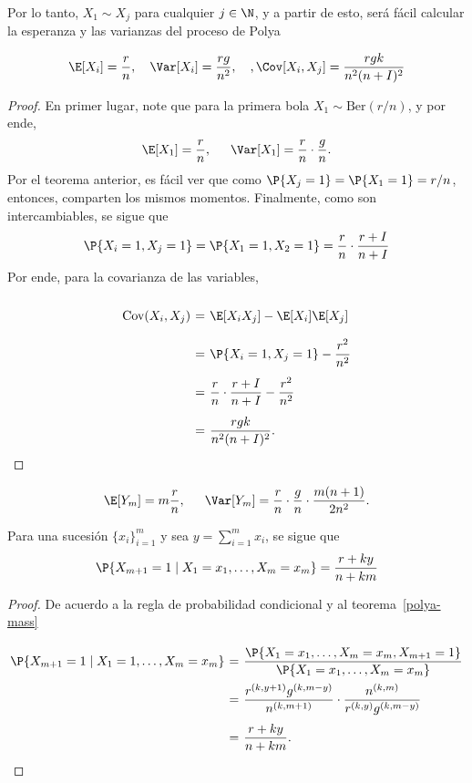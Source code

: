Por lo tanto, $X_1\sim X_j$ para cualquier $j\in\N$, y a partir de esto, será fácil calcular la esperanza y las varianzas del proceso de Polya

\begin{theorem}
    \[ \E[X_i] = \frac{r}{n},\hspace*{1em} \Var[X_i] = \frac{rg}{n^2},\hspace*{1em}, \Cov[X_i,X_j] = \frac{rgk}{n^2 (n+I)^2}  \]
\end{theorem}
\begin{proof}
    En primer lugar, note que para la primera bola $X_1 \sim \text{Ber}(r/n)$, y por ende,
    \[ \E[X_1] = \frac{r}{n},\hspace*{1.5em} \Var[X_1] = \frac{r}{n}\cdot\frac{g}{n}. \]
    Por el teorema anterior, es fácil ver que como $\P\{X_j = 1\} = \P\{X_1 = 1\} = r/n$, entonces, comparten los mismos momentos. Finalmente, como son intercambiables, se sigue que
    \[ \P\{X_i = 1, X_j = 1\} = \P\{X_1 = 1, X_2 = 1\} = \frac{r}{n}\cdot \frac{r+I}{n+I} \]
    Por ende, para la covarianza de las variables,
    \[ \everymath{\displaystyle}
    \arraycolsep=1.8pt\def\arraystretch{2.5}
    \begin{array}{rcl}
        \text{Cov}(X_i,X_j) & = & \E[X_i X_j] - \E[X_i]\E[X_j]\\
        & = & \P\{X_i = 1, X_j = 1\} - \frac{r^2}{n^2}\\
        & = & \frac{r}{n}\cdot \frac{r+I}{n+I} - \frac{r^2}{n^2}\\
        & = & \frac{rgk}{n^2 (n+I)^2}.
    \end{array} \]

\end{proof}

\begin{corollary}
    \[ \E[Y_m] = m\frac{r}{n},\hspace*{1.5em} \Var[Y_m] = \frac{r}{n} \cdot \frac{g}{n} \cdot \frac{m(n+1)}{2n^2}. \]
\end{corollary}

\begin{theorem}
    Para una sucesión $\{x_i\}_{i = 1}^m$ y sea $y = \sum_{i = 1}^m x_i$, se sigue que
    \[ \P\{X_{m+1} = 1 \;|\; X_1 = x_1, \ldots, X_m = x_m\} = \frac{r+ky}{n+km} \]
\end{theorem}
\begin{proof} De acuerdo a la regla de probabilidad condicional y al teorema~\ref{polya-mass}
    \[ \everymath{\displaystyle}
    \arraycolsep=1.8pt\def\arraystretch{2.5}
    \begin{array}{rcl}
        \P\{X_{m+1} = 1 \;|\; X_1 = 1, \ldots, X_m = x_m\} & = & \frac{\P\{X_1 = x_1, \ldots, X_m = x_m, X_{m+1} = 1\}}{\P\{X_1 = x_1, \ldots, X_m = x_m\}}\\
        & = & \frac{r^{(k,y+1)} g^{(k,m-y)}}{n^{(k,m+1)}} \cdot \frac{n^{(k,m)}}{r^{(k,y)} g^{(k,m-y)}}\\
        & = & \frac{r+ky}{n+km}.
    \end{array} \]
\end{proof}

